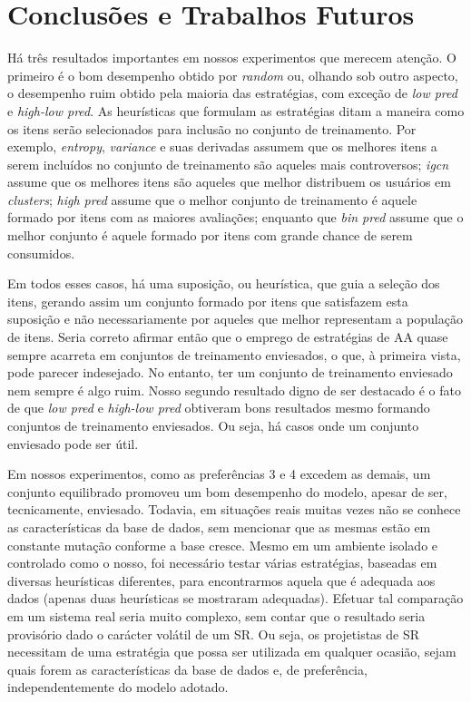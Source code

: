 \chapter{Conclusões e Trabalhos Futuros}
\label{cap:conclusao}

Há três resultados importantes em nossos experimentos que merecem atenção. O primeiro é o bom desempenho obtido por \textit{random} ou, olhando sob outro aspecto, o desempenho ruim obtido pela maioria das estratégias, com exceção de \textit{low pred} e \textit{high-low pred}. As heurísticas que formulam as estratégias ditam a maneira como os itens serão selecionados para inclusão no conjunto de treinamento. Por exemplo, \textit{entropy}, \textit{variance} e suas derivadas assumem que os melhores itens a serem incluídos no conjunto de treinamento são aqueles mais controversos; \textit{igcn} assume que os melhores itens são aqueles que melhor distribuem os usuários em \textit{clusters}; \textit{high pred} assume que o melhor conjunto de treinamento é aquele formado por itens com as maiores avaliações; enquanto que \textit{bin pred} assume que o melhor conjunto é aquele formado por itens com grande chance de serem consumidos.

Em todos esses casos, há uma suposição, ou heurística, que guia a seleção dos itens, gerando assim um conjunto formado por itens que satisfazem esta suposição e não necessariamente por aqueles que melhor representam a população de itens. Seria correto afirmar então que o emprego de estratégias de AA quase sempre acarreta em conjuntos de treinamento enviesados, o que, à primeira vista, pode parecer indesejado. No entanto, ter um conjunto de treinamento enviesado nem sempre é algo ruim. Nosso segundo resultado digno de ser destacado é o fato de que \textit{low pred} e \textit{high-low pred} obtiveram bons resultados mesmo formando conjuntos de treinamento enviesados. Ou seja, há casos onde um conjunto enviesado pode ser útil. 

Em nossos experimentos, como as preferências 3 e 4 excedem as demais, um conjunto equilibrado promoveu um bom desempenho do modelo, apesar de ser, tecnicamente, enviesado. Todavia, em situações reais muitas vezes não se conhece as características da base de dados, sem mencionar que as mesmas estão em constante mutação conforme a base cresce. Mesmo em um ambiente isolado e controlado como o nosso, foi necessário testar várias estratégias, baseadas em diversas heurísticas diferentes, para encontrarmos aquela que é adequada aos dados (apenas duas heurísticas se mostraram adequadas). Efetuar tal comparação em um sistema real seria muito complexo, sem contar que o resultado seria provisório dado o carácter volátil de um SR. Ou seja, os projetistas de SR necessitam de uma estratégia que possa ser utilizada em qualquer ocasião, sejam quais forem as características da base de dados e, de preferência, independentemente do modelo adotado.

